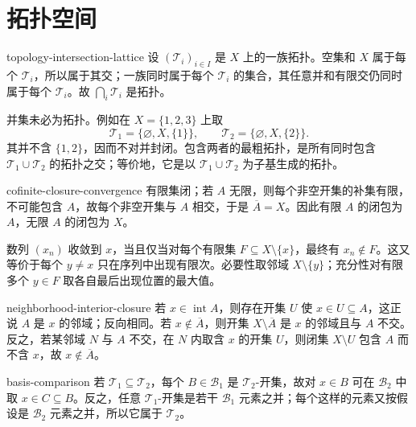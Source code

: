 \chapter{拓扑空间}
\label{chap:topological-spaces-solutions}

\begin{solution}{topology-intersection-lattice}
设 \((\mathcal T_i)_{i\in I}\) 是 \(X\) 上的一族拓扑。空集和 \(X\) 属于每个 \(\mathcal T_i\)，所以属于其交；一族同时属于每个 \(\mathcal T_i\) 的集合，其任意并和有限交仍同时属于每个 \(\mathcal T_i\)。故 \(\bigcap_i\mathcal T_i\) 是拓扑。

并集未必为拓扑。例如在 \(X=\{1,2,3\}\) 上取
\[
 \mathcal T_1=\{\varnothing,X,\{1\}\},\qquad
 \mathcal T_2=\{\varnothing,X,\{2\}\}.
\]
其并不含 \(\{1,2\}\)，因而不对并封闭。包含两者的最粗拓扑，是所有同时包含 \(\mathcal T_1\cup\mathcal T_2\) 的拓扑之交；等价地，它是以 \(\mathcal T_1\cup\mathcal T_2\) 为子基生成的拓扑。
\end{solution}

\begin{solution}{cofinite-closure-convergence}
有限集闭；若 \(A\) 无限，则每个非空开集的补集有限，不可能包含 \(A\)，故每个非空开集与 \(A\) 相交，于是 \(\overline A=X\)。因此有限 \(A\) 的闭包为 \(A\)，无限 \(A\) 的闭包为 \(X\)。

数列 \((x_n)\) 收敛到 \(x\)，当且仅当对每个有限集 \(F\subseteq X\setminus\{x\}\)，最终有 \(x_n\notin F\)。这又等价于每个 \(y\ne x\) 只在序列中出现有限次。必要性取邻域 \(X\setminus\{y\}\)；充分性对有限多个 \(y\in F\) 取各自最后出现位置的最大值。
\end{solution}

\begin{solution}{neighborhood-interior-closure}
若 \(x\in\operatorname{int}A\)，则存在开集 \(U\) 使 \(x\in U\subseteq A\)，这正说 \(A\) 是 \(x\) 的邻域；反向相同。若 \(x\notin\overline A\)，则开集 \(X\setminus\overline A\) 是 \(x\) 的邻域且与 \(A\) 不交。反之，若某邻域 \(N\) 与 \(A\) 不交，在 \(N\) 内取含 \(x\) 的开集 \(U\)，则闭集 \(X\setminus U\) 包含 \(A\) 而不含 \(x\)，故 \(x\notin\overline A\)。
\end{solution}

\begin{solution}{basis-comparison}
若 \(\mathcal T_1\subseteq\mathcal T_2\)，每个 \(B\in\mathcal B_1\) 是 \(\mathcal T_2\)-开集，故对 \(x\in B\) 可在 \(\mathcal B_2\) 中取 \(x\in C\subseteq B\)。反之，任意 \(\mathcal T_1\)-开集是若干 \(\mathcal B_1\) 元素之并；每个这样的元素又按假设是 \(\mathcal B_2\) 元素之并，所以它属于 \(\mathcal T_2\)。
\end{solution}

